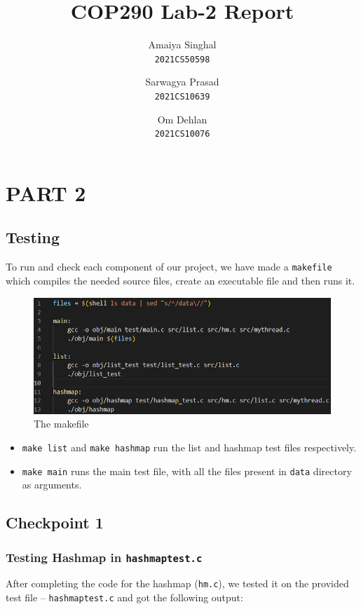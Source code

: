 \documentclass[notitlepage]{report}
\title{\Huge{COP290 Lab-2 Report}}
\author{
  Amaiya Singhal\\
  \texttt{2021CS50598}
  \and
  Sarwagya Prasad\\
  \texttt{2021CS10639}
  \and
  Om Dehlan\\
  \texttt{2021CS10076}
}
\date{}
\begin{document}
\maketitle

\section*{PART 2}
\subsection*{Testing}
To run and check each component of our project, we have made a \texttt{makefile} which compiles the needed source files, create an executable file and then runs it.

\begin{figure}[hbp]
    \centering
    \includegraphics[width = 1\linewidth]{makefile_code.png}
    \caption*{The makefile}
\end{figure}
\begin{itemize}
    \item \texttt{make list} and \texttt{make hashmap} run the list and hashmap test files respectively.
    \item \texttt{make main} runs the main test file, with all the files present in \texttt{data} directory as arguments.
\end{itemize}

\pagebreak

\subsection*{Checkpoint 1}
\subsubsection*{Testing Hashmap in \texttt{hashmap\textunderscore test.c}}
After completing the code for the hashmap (\texttt{hm.c}), we tested it on the provided test file – \texttt{hashmap\textunderscore test.c} and got the following output:
\end{document}
